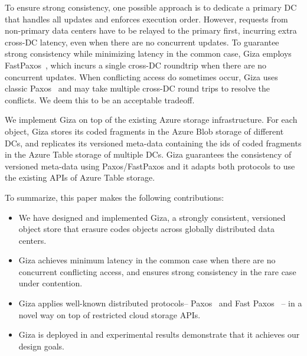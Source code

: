To ensure strong consistency, one
possible approach is to dedicate a primary DC that handles all updates and
enforces execution order. However, requests from non-primary data centers have
to be relayed to the primary first, incurring extra cross-DC latency, even when
there are no concurrent updates. To guarantee strong consistency while
minimizing latency in the common case, Giza employs 
FastPaxos~\cite{lamport05fast}, which incurs a single cross-DC roundtrip when
there are no concurrent updates.  When conflicting access do sometimes occur,
Giza uses classic Paxos~\cite{lamport01paxos} and may take multiple cross-DC
round trips to resolve the conflicts. We deem this to be an acceptable
tradeoff. 

We implement Giza on top of the existing Azure storage infrastructure.  For
each object, Giza stores its coded fragments in the Azure Blob storage of
different DCs, and replicates its versioned meta-data containing the ids of 
coded fragments in the Azure Table storage of multiple DCs.  Giza guarantees
the consistency of versioned meta-data using Paxos/FastPaxos and it adapts both
protocols to use the existing APIs of Azure Table storage.


To summarize, this paper makes the following contributions:
\begin{itemize}
    \item We have designed and implemented Giza, a strongly consistent,
      versioned object store that erasure codes objects across globally
      distributed data centers.
    \item Giza achieves minimum latency in the common case when there are no concurrent conflicting access, and ensures strong consistency in the rare case under contention.
    \item Giza applies well-known distributed protocols-- Paxos~\cite{lamport01paxos}
      and Fast Paxos~\cite{lamport05fast} -- in a novel way on top of restricted cloud storage APIs.
    \item Giza is deployed in \deployment and experimental results demonstrate
      that it achieves our design goals.
\end{itemize}

